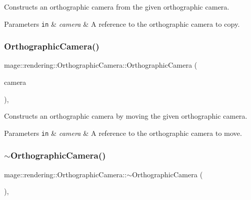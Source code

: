 Constructs an orthographic camera from the given orthographic camera.


\begin{DoxyParams}[1]{Parameters}
\mbox{\tt in}  & {\em camera} & A reference to the orthographic camera to copy. \\
\hline
\end{DoxyParams}
\hypertarget{classmage_1_1rendering_1_1_orthographic_camera_a5b2c7d870e2077807057246abf3b76b1}{}\label{classmage_1_1rendering_1_1_orthographic_camera_a5b2c7d870e2077807057246abf3b76b1} 
\subsubsection{\texorpdfstring{Orthographic\+Camera()}{OrthographicCamera()}\hspace{0.1cm}{\footnotesize\ttfamily [3/3]}}
{\footnotesize\ttfamily mage\+::rendering\+::\+Orthographic\+Camera\+::\+Orthographic\+Camera (\begin{DoxyParamCaption}\item[{\hyperlink{classmage_1_1rendering_1_1_orthographic_camera}{Orthographic\+Camera} \&\&}]{camera }\end{DoxyParamCaption})\hspace{0.3cm}{\ttfamily [default]}, {\ttfamily [noexcept]}}

Constructs an orthographic camera by moving the given orthographic camera.


\begin{DoxyParams}[1]{Parameters}
\mbox{\tt in}  & {\em camera} & A reference to the orthographic camera to move. \\
\hline
\end{DoxyParams}
\hypertarget{classmage_1_1rendering_1_1_orthographic_camera_a469e4af1c85a332b8feded9f577a05f6}{}\label{classmage_1_1rendering_1_1_orthographic_camera_a469e4af1c85a332b8feded9f577a05f6} 
\subsubsection{\texorpdfstring{$\sim$\+Orthographic\+Camera()}{~OrthographicCamera()}}
{\footnotesize\ttfamily mage\+::rendering\+::\+Orthographic\+Camera\+::$\sim$\+Orthographic\+Camera (\begin{DoxyParamCaption}{ }\end{DoxyParamCaption})\hspace{0.3cm}{\ttfamily [virtual]}, {\ttfamily [default]}}


